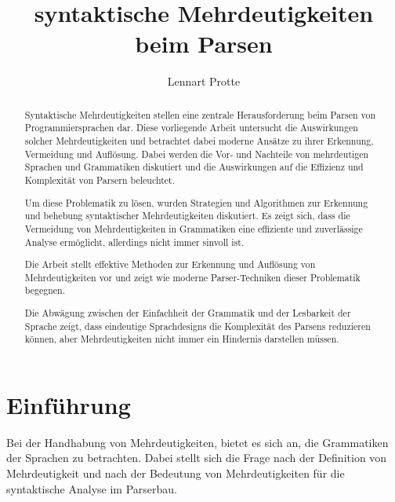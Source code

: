 \documentclass[runningheads]{llncs}
\begin{document}
%
	\title{syntaktische Mehrdeutigkeiten beim Parsen}
%
%
	\author{Lennart Protte}
%
%
%
	\maketitle              %
%
	\begin{abstract}
		Syntaktische Mehrdeutigkeiten stellen eine zentrale Herausforderung beim Parsen von Programmiersprachen dar.
		Diese vorliegende Arbeit untersucht die Auswirkungen solcher Mehrdeutigkeiten
		und betrachtet dabei moderne Ansätze zu ihrer Erkennung, Vermeidung und Auflösung.
		Dabei werden die Vor- und Nachteile von mehrdeutigen Sprachen und Grammatiken diskutiert
		und die Auswirkungen auf die Effizienz und Komplexität von Parsern beleuchtet.

		Um diese Problematik zu lösen,
		wurden Strategien und Algorithmen zur Erkennung und behebung syntaktischer Mehrdeutigkeiten diskutiert.
		Es zeigt sich, dass die Vermeidung von Mehrdeutigkeiten in Grammatiken eine effiziente und zuverlässige Analyse ermöglicht,
		allerdings nicht immer sinvoll ist.

		Die Arbeit stellt effektive Methoden zur Erkennung und Auflösung von Mehrdeutigkeiten vor
		und zeigt wie moderne Parser-Techniken dieser Problematik begegnen.

		Die Abwägung zwischen der Einfachheit der Grammatik und der Lesbarkeit der Sprache zeigt,
		dass eindeutige Sprachdesigns die Komplexität des Parsens reduzieren können,
		aber Mehrdeutigkeiten nicht immer ein Hindernis darstellen müssen.

	\end{abstract}


	\section{Einführung}
	Bei der Handhabung von Mehrdeutigkeiten, bietet es sich an, die Grammatiken der Sprachen zu betrachten.
	Dabei stellt sich die Frage nach der Definition von Mehrdeutigkeit
	und nach der Bedeutung von Mehrdeutigkeiten für die syntaktische Analyse im Parserbau.
\end{document}
